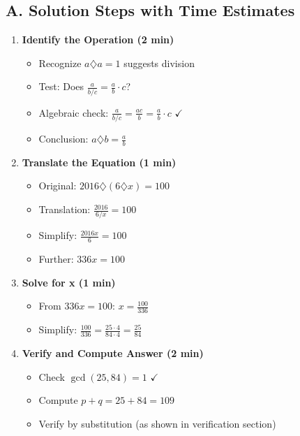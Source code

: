 \documentclass[11pt]{article}
\begin{document}
\begin{roadmapbox}
\subsection*{A. Solution Steps with Time Estimates}
\begin{enumerate}[leftmargin=*]
    \item \textbf{Identify the Operation (2 min)}
    \begin{itemize}
        \item Recognize $a \diamondsuit a = 1$ suggests division
        \item Test: Does $\frac{a}{b/c} = \frac{a}{b} \cdot c$?
        \item Algebraic check: $\frac{a}{b/c} = \frac{ac}{b} = \frac{a}{b} \cdot c$ $\checkmark$
        \item Conclusion: $a \diamondsuit b = \frac{a}{b}$
    \end{itemize}
    
    \item \textbf{Translate the Equation (1 min)}
    \begin{itemize}
        \item Original: $2016 \diamondsuit (6 \diamondsuit x) = 100$
        \item Translation: $\frac{2016}{6/x} = 100$
        \item Simplify: $\frac{2016x}{6} = 100$
        \item Further: $336x = 100$
    \end{itemize}
    
    \item \textbf{Solve for x (1 min)}
    \begin{itemize}
        \item From $336x = 100$: $x = \frac{100}{336}$
        \item Simplify: $\frac{100}{336} = \frac{25 \cdot 4}{84 \cdot 4} = \frac{25}{84}$
    \end{itemize}
    
    \item \textbf{Verify and Compute Answer (2 min)}
    \begin{itemize}
        \item Check $\gcd(25, 84) = 1$ $\checkmark$
        \item Compute $p + q = 25 + 84 = 109$
        \item Verify by substitution (as shown in verification section)
    \end{itemize}
\end{enumerate}


\end{roadmapbox}
\end{document}
